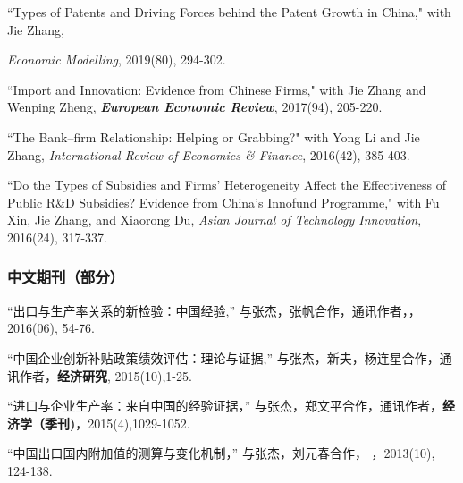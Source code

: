 \documentclass[letterpaper]{article}
\begin{document}
``Types of Patents and Driving Forces behind the Patent Growth in China," with Jie Zhang, {\textit{Economic Modelling}, 2019(80), 294-302.

\vspace{0.5em}
``Import and Innovation: Evidence from Chinese Firms," with Jie Zhang and Wenping Zheng, {\textbf{\textit{European Economic Review}}}, 2017(94), 205-220.

\vspace{0.5em}
``The Bank–firm Relationship: Helping or Grabbing?" with Yong Li and Jie Zhang, {\textit{International Review of Economics \& Finance}}, 2016(42), 385-403.

\vspace{0.5em}
``Do the Types of Subsidies and Firms’ Heterogeneity Affect the Effectiveness of Public R\&D Subsidies? Evidence from China’s Innofund Programme," with Fu Xin, Jie Zhang, and Xiaorong Du, \textit{Asian Journal of Technology Innovation}, 2016(24), 317-337.

\subsubsection*{中文期刊（部分）}
“出口与生产率关系的新检验：中国经验,” 与张杰，张帆合作，通讯作者，{}，2016(06), 54-76.

\vspace{0.5em}
“中国企业创新补贴政策绩效评估：理论与证据,” 与张杰，新夫，杨连星合作，通讯作者，{\bf 经济研究}, 2015(10),1-25.

\vspace{0.5em}
“进口与企业生产率：来自中国的经验证据，” 与张杰，郑文平合作，通讯作者，{\bf 经济学（季刊)}，2015(4),1029-1052.

\vspace{0.5em}
“中国出口国内附加值的测算与变化机制，” 与张杰，刘元春合作， {}，2013(10), 124-138.

}
\end{document}

